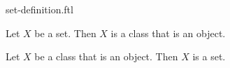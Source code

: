 \documentclass{stex}
\begin{document}
\begin{smodule}{set-definition.ftl}
  \begin{flemma*}
    Let $X$ be a set.
    Then $X$ is a class that is an object.
  \end{flemma*}
  
  \begin{flemma*}
    Let $X$ be a class that is an object.
    Then $X$ is a set.
  \end{flemma*}
\end{smodule}
\end{document}
